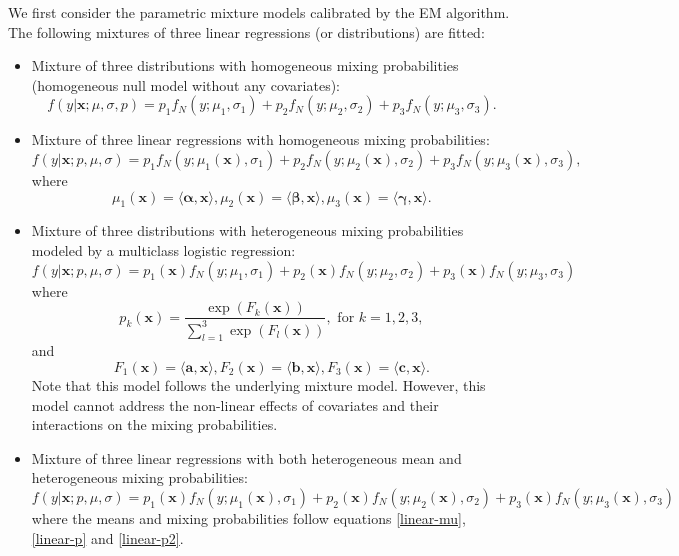 \documentclass[11pt]{article}
\numberwithin{equation}{section}
\def\bx{\boldsymbol{x}}
\begin{document}
We first consider the parametric mixture models calibrated by the EM algorithm. The following mixtures of three linear regressions (or distributions) are fitted:
\begin{itemize}
	\item 	Mixture of three distributions with homogeneous mixing probabilities (homogeneous null model without any covariates):
	\begin{equation}\label{gaussian-0}
		f(y|\bx;\mu,\sigma,p)=p_1f_N(y;\mu_1,\sigma_1)+p_2f_N(y;\mu_2,\sigma_2)+p_3f_N(y;\mu_3,\sigma_3).
	\end{equation}

	\item 	Mixture of three linear regressions with homogeneous mixing probabilities:
\begin{equation}\label{gaussian-glm-mu}
	f(y|\bx;p,\mu,\sigma)=p_1f_N(y;\mu_1(\bx),\sigma_1)+p_2f_N(y;\mu_2(\bx),\sigma_2)+p_3f_N(y;\mu_3(\bx),\sigma_3),
\end{equation}
where
\begin{equation}\label{linear-mu}
	\mu_1(\bx)=\langle\boldsymbol{\alpha},\bx\rangle, \mu_2(\bx)=\langle\boldsymbol{\beta},\bx\rangle,\mu_3(\bx)=\langle\boldsymbol{\gamma},\bx\rangle.
\end{equation}

\item 	Mixture of three distributions with heterogeneous mixing probabilities modeled by a multiclass logistic regression:
\begin{equation}\label{gaussian-glm-p}
	f(y|\bx;p,\mu,\sigma)=p_1(\bx)f_N(y;\mu_1,\sigma_1)+p_2(\bx)f_N(y;\mu_2,\sigma_2)+p_3(\bx)f_N(y;\mu_3,\sigma_3)
\end{equation}
where
\begin{equation}\label{linear-p}
	p_k(\bx)=\frac{\exp\left(F_k(\bx)\right)}{\sum_{l=1}^{3}\exp\left(F_l(\bx)\right)}, \text{ for } k=1,2,3,
\end{equation}
and 
\begin{equation}\label{linear-p2}
	F_1(\bx)=\langle \boldsymbol{a},\bx\rangle, F_2(\bx)=\langle \boldsymbol{b},\bx\rangle,F_3(\bx)=\langle \boldsymbol{c},\bx\rangle.
\end{equation}
Note that this model follows the underlying mixture model. 
However, this model cannot address the non-linear effects of covariates and their interactions on the mixing probabilities.

	\item 	Mixture of three linear regressions with both heterogeneous mean and heterogeneous mixing probabilities:
	\begin{equation}\label{gaussian-glm-b}
		f(y|\bx;p,\mu,\sigma)=p_1(\bx)f_N(y;\mu_1(\bx),\sigma_1)+p_2(\bx)f_N(y;\mu_2(\bx),\sigma_2)+p_3(\bx)f_N(y;\mu_3(\bx),\sigma_3)
	\end{equation}
where the means and mixing probabilities follow equations \eqref{linear-mu}, \eqref{linear-p} and \eqref{linear-p2}.
\end{itemize}
\end{document}
